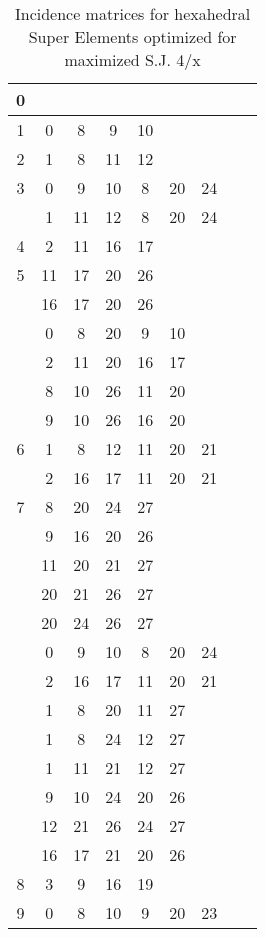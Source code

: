 \begin{table}[H]
\centering
\caption{Incidence matrices for hexahedral Super Elements optimized for maximized S.J. 4/x}
\label{tab:inz_matricis_hex_maxSJ}
\begin{tabular}{|c|cccccccc|}
\hline
0 & & & & & & & & \\
\hline
1  & 0 & 8 & 9 & 10 &   &   &   &  \\
\hline
2  & 1 & 8 & 11 & 12 &   &   &   &  \\
\hline
3  & 0 & 9 & 10 & 8 & 20 & 24 &   &  \\
 & 1 & 11 & 12 & 8 & 20 & 24 &   &  \\
\hline
4  & 2 & 11 & 16 & 17 &   &   &   &  \\
\hline
5  & 11 & 17 & 20 & 26 &   &   &   &  \\
 & 16 & 17 & 20 & 26 &   &   &   &  \\
 & 0 & 8 & 20 & 9 & 10 &   &   &  \\
 & 2 & 11 & 20 & 16 & 17 &   &   &  \\
 & 8 & 10 & 26 & 11 & 20 &   &   &  \\
 & 9 & 10 & 26 & 16 & 20 &   &   &  \\
\hline
6  & 1 & 8 & 12 & 11 & 20 & 21 &   &  \\
 & 2 & 16 & 17 & 11 & 20 & 21 &   &  \\
\hline
7  & 8 & 20 & 24 & 27 &   &   &   &  \\
 & 9 & 16 & 20 & 26 &   &   &   &  \\
 & 11 & 20 & 21 & 27 &   &   &   &  \\
 & 20 & 21 & 26 & 27 &   &   &   &  \\
 & 20 & 24 & 26 & 27 &   &   &   &  \\
 & 0 & 9 & 10 & 8 & 20 & 24 &   &  \\
 & 2 & 16 & 17 & 11 & 20 & 21 &   &  \\
 & 1 & 8 & 20 & 11 & 27 &   &   &  \\
 & 1 & 8 & 24 & 12 & 27 &   &   &  \\
 & 1 & 11 & 21 & 12 & 27 &   &   &  \\
 & 9 & 10 & 24 & 20 & 26 &   &   &  \\
 & 12 & 21 & 26 & 24 & 27 &   &   &  \\
 & 16 & 17 & 21 & 20 & 26 &   &   &  \\
\hline
8  & 3 & 9 & 16 & 19 &   &   &   &  \\
\hline
9  & 0 & 8 & 10 & 9 & 20 & 23 &   &  \\

\end{tabular}
\end{table}
